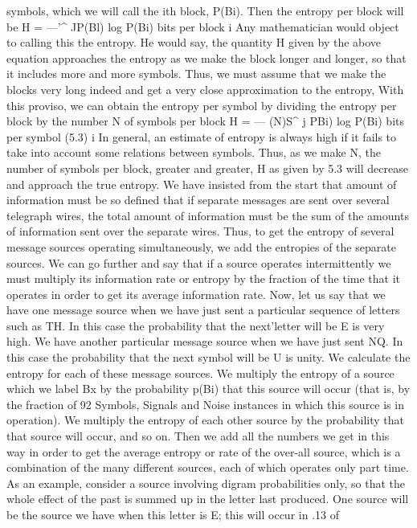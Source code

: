 symbols, which we will call the ith block, P(Bi). Then the entropy
per block will be
H = —'^ JP(Bl) log P(Bi) bits per block
i
Any mathematician would object to calling this the entropy. He
would say, the quantity H given by the above equation approaches
the entropy as we make the block longer and longer, so that it
includes more and more symbols. Thus, we must assume that we
make the blocks very long indeed and get a very close approximation
to the entropy, With this proviso, we can obtain the entropy
per symbol by dividing the entropy per block by the number N of
symbols per block
H = — (\/N)S^ j P{Bi) log P(Bi) bits per symbol (5.3)
i
In general, an estimate of entropy is always high if it fails to take
into account some relations between symbols. Thus, as we make
N, the number of symbols per block, greater and greater, H as
given by 5.3 will decrease and approach the true entropy.
We have insisted from the start that amount of information must
be so defined that if separate messages are sent over several telegraph
wires, the total amount of information must be the sum of
the amounts of information sent over the separate wires. Thus, to
get the entropy of several message sources operating simultaneously,
we add the entropies of the separate sources. We can go
further and say that if a source operates intermittently we must
multiply its information rate or entropy by the fraction of the time
that it operates in order to get its average information rate.
Now, let us say that we have one message source when we have
just sent a particular sequence of letters such as TH. In this case
the probability that the next'letter will be E is very high. We have
another particular message source when we have just sent NQ. In
this case the probability that the next symbol will be U is unity.
We calculate the entropy for each of these message sources. We
multiply the entropy of a source which we label Bx by the probability
p(Bi) that this source will occur (that is, by the fraction of
92
Symbols, Signals and Noise
instances in which this source is in operation). We multiply the
entropy of each other source by the probability that that source
will occur, and so on. Then we add all the numbers we get in this
way in order to get the average entropy or rate of the over-all
source, which is a combination of the many different sources, each
of which operates only part time. As an example, consider a source
involving digram probabilities only, so that the whole effect of the
past is summed up in the letter last produced. One source will be
the source we have when this letter is E; this will occur in .13 of
}
